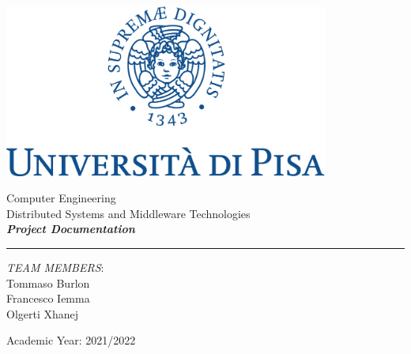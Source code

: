 \documentclass[12pt]{article}
\begin{document}
	
	
	\begin{titlepage}
		\begin{center}
			
			\begin{center}
				\includegraphics[width=0.8\textwidth]{img/marchio_unipi_pant541-eps-converted-to.pdf}         
			\end{center}
			{\Large
				\vspace{15mm}
				Computer Engineering\\
				\vspace{5mm}
				Distributed Systems and Middleware Technologies}\\
			\vspace{30mm} 
			{\Huge\textbf{\textit{Project Documentation}}}\\
			\vspace{70mm} 
			\par\noindent\rule{\textwidth}{0.4pt}
			\begin{flushright}
				\textit{TEAM MEMBERS}:\\
				Tommaso Burlon\\
				Francesco Iemma\\
				Olgerti Xhanej\\
			\end{flushright}
			\vfill
			Academic Year: 2021/2022\\        
		\end{center}
	\end{titlepage} 

	\tableofcontents
	
	
	
	
\end{document}
